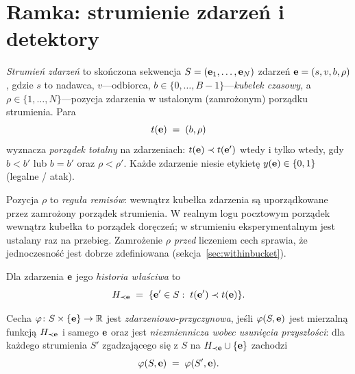 \chapter{Ramka: strumienie zdarzeń i detektory}
\label{sec:setting}

\begin{definition}
\label{def:stream}
\emph{Strumień zdarzeń} to skończona sekwencja
$S=(\mathbf{e}_1,\dots,\mathbf{e}_N)$ zdarzeń
$\mathbf{e}=(s,v,b,\rho)$, gdzie $s$ to nadawca, $v$---odbiorca,
$b\in\{0,\dots,B-1\}$---\emph{kubełek czasowy}, a
$\rho\in\{1,\dots,N\}$---pozycja zdarzenia w ustalonym (zamrożonym)
porządku strumienia. Para
\[
t(\mathbf{e}) \;=\; (b,\rho)
\]
wyznacza \emph{porządek totalny} na zdarzeniach: $t(\mathbf{e})\prec
t(\mathbf{e}')$ wtedy i tylko wtedy, gdy $b<b'$ lub $b=b'$ oraz
$\rho<\rho'$. Każde zdarzenie niesie etykietę $y(\mathbf{e})\in\{0,1\}$
(legalne / atak).
\end{definition}

Pozycja $\rho$ to \emph{reguła remisów}: wewnątrz kubełka zdarzenia są
uporządkowane przez zamrożony porządek strumienia. W realnym logu
pocztowym porządek wewnątrz kubełka to porządek doręczeń; w strumieniu
eksperymentalnym jest ustalany raz na przebieg. Zamrożenie $\rho$
\emph{przed} liczeniem cech sprawia, że jednoczesność jest dobrze
zdefiniowana (sekcja~\ref{sec:withinbucket}).

\begin{definition}[Historia]
Dla zdarzenia $\mathbf{e}$ jego \emph{historia właściwa} to
\[
H_{\prec \mathbf{e}} \;=\; \{\mathbf{e}'\in S:\; t(\mathbf{e}')\prec t(\mathbf{e})\}.
\]
\end{definition}

\begin{definition}
\label{def:causal-feature}
Cecha $\varphi\colon S\times \{\mathbf{e}\}\to\mathbb{R}$ jest
\emph{zdarzeniowo-przyczynowa}, jeśli $\varphi(S,\mathbf{e})$ jest mierzalną
funkcją $H_{\prec \mathbf{e}}$ i samego $\mathbf{e}$ oraz jest
\emph{niezmiennicza wobec usunięcia przyszłości}: dla każdego strumienia
$S'$ zgadzającego się z $S$ na $H_{\prec\mathbf{e}}\cup\{\mathbf{e}\}$ zachodzi
\[
\varphi(S,\mathbf{e}) \;=\; \varphi(S',\mathbf{e}).
\]
\end{definition}

